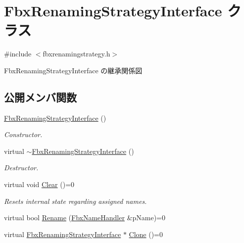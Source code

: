 \hypertarget{class_fbx_renaming_strategy_interface}{}\section{Fbx\+Renaming\+Strategy\+Interface クラス}
\label{class_fbx_renaming_strategy_interface}


{\ttfamily \#include $<$fbxrenamingstrategy.\+h$>$}



Fbx\+Renaming\+Strategy\+Interface の継承関係図
\subsection*{公開メンバ関数}
\begin{DoxyCompactItemize}
\item 
\hyperlink{class_fbx_renaming_strategy_interface_a4c211fabbf906c3e3102a17febe1a428}{Fbx\+Renaming\+Strategy\+Interface} ()
\begin{DoxyCompactList}\small\item\em Constructor. \end{DoxyCompactList}\item 
virtual \hyperlink{class_fbx_renaming_strategy_interface_ab52664f630e238593eeba2bb204cebbe}{$\sim$\+Fbx\+Renaming\+Strategy\+Interface} ()
\begin{DoxyCompactList}\small\item\em Destructor. \end{DoxyCompactList}\item 
virtual void \hyperlink{class_fbx_renaming_strategy_interface_a2090b5ae43936b617ec5d75015923f69}{Clear} ()=0
\begin{DoxyCompactList}\small\item\em Resets internal state regarding assigned names. \end{DoxyCompactList}\item 
virtual bool \hyperlink{class_fbx_renaming_strategy_interface_a1b91016c68dd9c7031624026fd39638a}{Rename} (\hyperlink{class_fbx_name_handler}{Fbx\+Name\+Handler} \&p\+Name)=0
\item 
virtual \hyperlink{class_fbx_renaming_strategy_interface}{Fbx\+Renaming\+Strategy\+Interface} $\ast$ \hyperlink{class_fbx_renaming_strategy_interface_ab394ed8a9b5d3ec40334bc933af83907}{Clone} ()=0
\end{DoxyCompactItemize}


